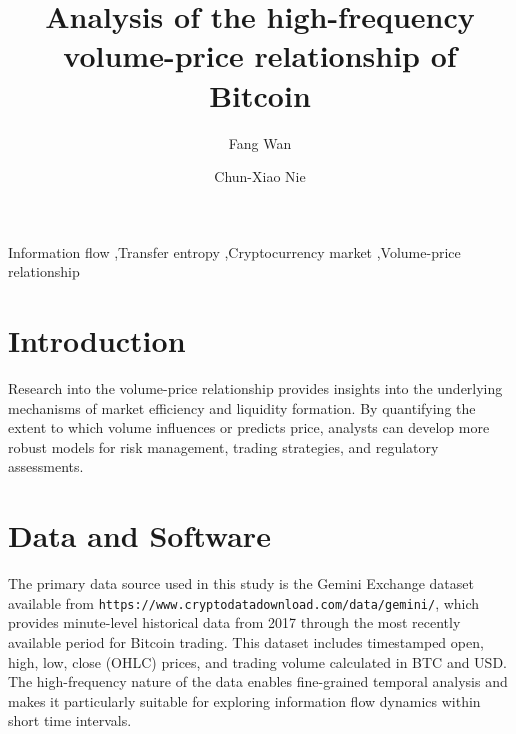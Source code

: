 \documentclass{elsarticle}
\begin{document}
\begin{frontmatter}

\title{Analysis of the high-frequency volume-price relationship of Bitcoin}

\author[mymainaddress]{Fang Wan}

\author[mymainaddress,mysecondaryaddress]{Chun-Xiao Nie}



\address[mymainaddress]{School of Statistics and Mathematics, Zhejiang Gongshang University, Hangzhou 310018, China}
\address[mysecondaryaddress]{Collaborative Innovation Center of Statistical Data Engineering, Technology \& Application, Zhejiang Gongshang University, Hangzhou, 310018, China}

\begin{abstract}

\end{abstract}

\begin{keyword}
Information flow  \sep Transfer entropy \sep Cryptocurrency market \sep Volume-price relationship
\end{keyword}

\end{frontmatter}
%
\linenumbers

\section{Introduction}
Research into the volume-price relationship provides insights into the underlying mechanisms of market efficiency and liquidity formation. By quantifying the extent to which volume influences or predicts price, analysts can develop more robust models for risk management, trading strategies, and regulatory assessments.

\section{Data and Software}
The primary data source used in this study is the Gemini Exchange dataset available from \texttt{https://www.cryptodatadownload.com/data/gemini/}, which provides minute-level historical data from 2017 through the most recently available period for Bitcoin trading. This dataset includes timestamped open, high, low, close (OHLC) prices, and trading volume calculated in BTC and USD. The high-frequency nature of the data enables fine-grained temporal analysis and makes it particularly suitable for exploring information flow dynamics within short time intervals.
\end{document}
